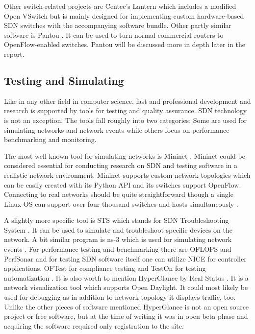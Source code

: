 Other switch-related projects are Centec’s Lantern \cite{Lantern} which includes a modified Open VSwitch but is mainly designed for implementing custom hardware-based SDN switches with the accompanying software bundle. Other partly similar software is Pantou \cite{Yia04}. It can be used to turn normal commercial routers to OpenFlow-enabled switches. Pantou will be discussed more in depth later in the report.

\subsection{Testing and Simulating}

Like in any other field in computer science, fast and professional development and research is supported by tools for testing and quality assurance. SDN technology is not an exception. The tools fall roughly into two categories: Some are used for simulating networks and network events while others focus on performance benchmarking and monitoring.

The most well known tool for simulating networks is Mininet \cite{MN14}. Mininet could be considered essential for conducting research on SDN and testing software in a realistic network environment. Mininet supports custom network topologies which can be easily created with its Python API and its switches support OpenFlow. Connecting to real networks should be quite straightforward though a single Linux OS can support over four thousand switches and hosts simultaneously \cite{MN14}. 

A slightly more specific tool is STS which stands for SDN Troubleshooting System \cite{STS}. It can be used to simulate and troubleshoot specific devices on the network. A bit similar program is ns-3 which is used for simulating network events \cite{NS3}. For performance testing and benchmarking there are OFLOPS and PerfSonar \cite{OFLOPS, Perf} and for testing SDN software itself one can utilize NICE \cite{NICE} for controller applications, OFTest for compliance testing \cite{OFTest} and TestOn for testing automatization \cite{TestOn}. It is also worth to mention HyperGlance by Real Status \cite{Hyper}. It is a network visualization tool which supports Open Daylight. It could most likely be used for debugging as in addition to network topology it displays traffic, too. Unlike the other pieces of software mentioned HyperGlance is not an open source project or free software, but at the time of writing it was in open beta phase and acquiring the software required only registration to the site.

